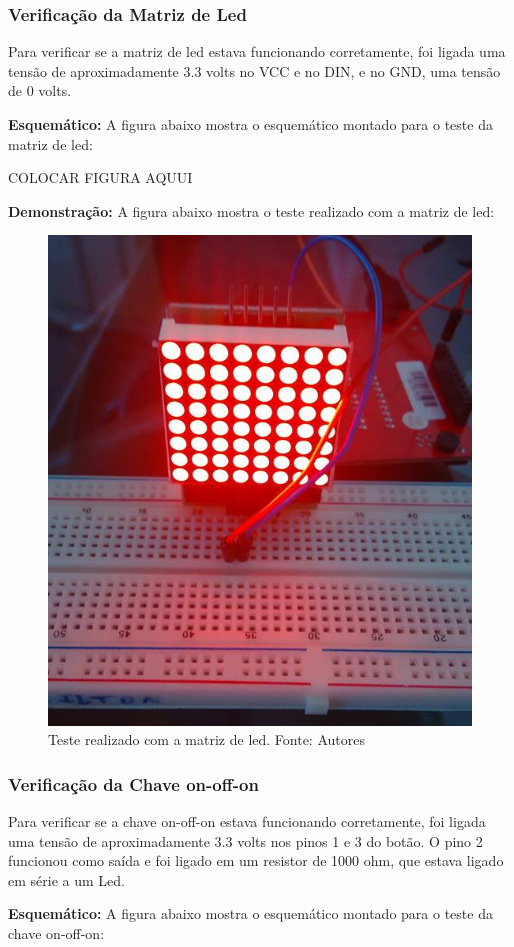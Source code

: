 \documentclass[conference]{IEEEtran}
\begin{document}
\subsubsection{Verificação da Matriz de Led}
Para verificar se a matriz de led estava funcionando corretamente, foi ligada uma tensão de aproximadamente 3.3 volts no VCC e no DIN, e no GND, uma tensão de 0 volts.

\textbf{Esquemático:}
A figura abaixo mostra o esquemático montado para o teste da matriz de led:

COLOCAR FIGURA AQUUI

\textbf{Demonstração:}
A figura abaixo mostra o teste realizado com a matriz de led:
\begin{figure}
	\centering
	\includegraphics[width=0.7\linewidth]{dem_matriz}
	\caption{Teste realizado com a matriz de led. Fonte: Autores}
	\label{fig:dem_matriz}
\end{figure}

\subsubsection{Verificação da Chave on-off-on}
Para verificar se a chave on-off-on estava funcionando corretamente, foi ligada uma tensão de aproximadamente 3.3 volts nos pinos 1 e 3 do botão. O pino 2 funcionou como saída e foi ligado em um resistor de 1000 ohm, que estava ligado em série a um Led. 

\textbf{Esquemático:}
A figura abaixo mostra o esquemático montado para o teste da chave on-off-on:
\end{document}
